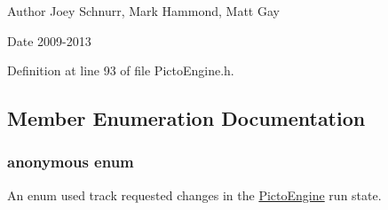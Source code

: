 \begin{DoxyAuthor}{Author}
Joey Schnurr, Mark Hammond, Matt Gay 
\end{DoxyAuthor}
\begin{DoxyDate}{Date}
2009-\/2013 
\end{DoxyDate}


Definition at line 93 of file Picto\-Engine.\-h.



\subsection{Member Enumeration Documentation}
\hypertarget{class_picto_1_1_engine_1_1_picto_engine_aa78bf87cbc1731636a87e4d160b16743}{\subsubsection[{anonymous enum}]{\setlength{\rightskip}{0pt plus 5cm}anonymous enum}}\label{class_picto_1_1_engine_1_1_picto_engine_aa78bf87cbc1731636a87e4d160b16743}


An enum used track requested changes in the \hyperlink{class_picto_1_1_engine_1_1_picto_engine}{Picto\-Engine} run state. 

